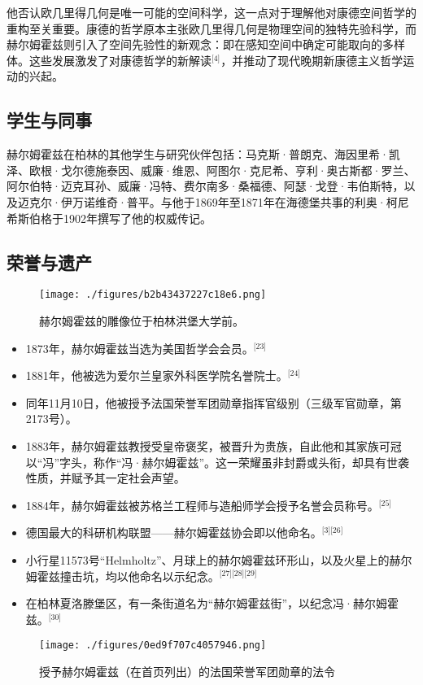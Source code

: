 他否认欧几里得几何是唯一可能的空间科学，这一点对于理解他对康德空间哲学的重构至关重要。康德的哲学原本主张欧几里得几何是物理空间的独特先验科学，而赫尔姆霍兹则引入了空间先验性的新观念：即在感知空间中确定可能取向的多样体。这些发展激发了对康德哲学的新解读\(^\text{[4]}\)，并推动了现代晚期新康德主义哲学运动的兴起。
\subsection{学生与同事}
赫尔姆霍兹在柏林的其他学生与研究伙伴包括：马克斯·普朗克、海因里希·凯泽、欧根·戈尔德施泰因、威廉·维恩、阿图尔·克尼希、亨利·奥古斯都·罗兰、阿尔伯特·迈克耳孙、威廉·冯特、费尔南多·桑福德、阿瑟·戈登·韦伯斯特，以及迈克尔·伊万诺维奇·普平。与他于1869年至1871年在海德堡共事的利奥·柯尼希斯伯格于1902年撰写了他的权威传记。
\subsection{荣誉与遗产}
\begin{figure}[ht]
\centering
\texttt{[image: ./figures/b2b43437227c18e6.png]}
\caption{赫尔姆霍兹的雕像位于柏林洪堡大学前。} \label{fig_HEMfhm_7}
\end{figure}
\begin{itemize}
\item 1873年，赫尔姆霍兹当选为美国哲学会会员。\(^\text{[23]}\)
\item 1881年，他被选为爱尔兰皇家外科医学院名誉院士。\(^\text{[24]}\)
\item 同年11月10日，他被授予法国荣誉军团勋章指挥官级别（三级军官勋章，第2173号）。
\item 1883年，赫尔姆霍兹教授受皇帝褒奖，被晋升为贵族，自此他和其家族可冠以“冯”字头，称作“冯·赫尔姆霍兹”。这一荣耀虽非封爵或头衔，却具有世袭性质，并赋予其一定社会声望。
\item 1884年，赫尔姆霍兹被苏格兰工程师与造船师学会授予名誉会员称号。\(^\text{[25]}\)
\item 德国最大的科研机构联盟——赫尔姆霍兹协会即以他命名。\(^\text{[3][26]}\)
\item 小行星11573号“Helmholtz”、月球上的赫尔姆霍兹环形山，以及火星上的赫尔姆霍兹撞击坑，均以他命名以示纪念。\(^\text{[27][28][29]}\)
\item 在柏林夏洛滕堡区，有一条街道名为“赫尔姆霍兹街”，以纪念冯·赫尔姆霍兹。\(^\text{[30]}\)
\end{itemize}
\begin{figure}[ht]
\centering
\texttt{[image: ./figures/0ed9f707c4057946.png]}
\caption{授予赫尔姆霍兹（在首页列出）的法国荣誉军团勋章的法令} \label{fig_HEMfhm_8}
\end{figure}